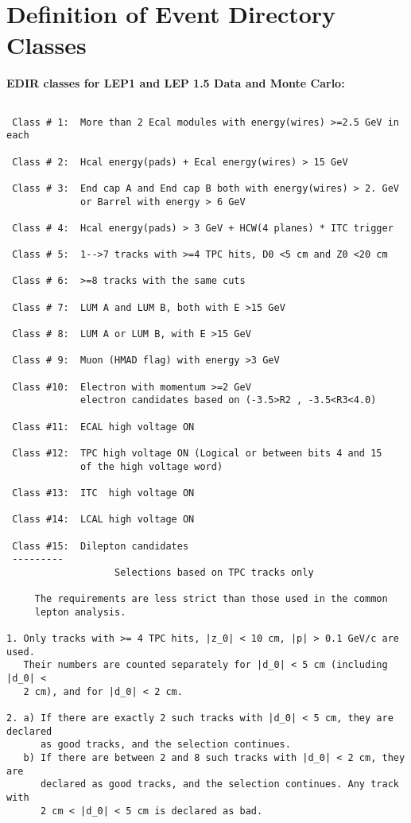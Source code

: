 \chapter{\label{sec-SED}Definition of Event Directory Classes}
\par
 
\bf{EDIR classes for LEP1 and LEP 1.5 Data and Monte Carlo:}
\par
\begin{verbatim}
 
 Class # 1:  More than 2 Ecal modules with energy(wires) >=2.5 GeV in each
 
 Class # 2:  Hcal energy(pads) + Ecal energy(wires) > 15 GeV
 
 Class # 3:  End cap A and End cap B both with energy(wires) > 2. GeV
             or Barrel with energy > 6 GeV
 
 Class # 4:  Hcal energy(pads) > 3 GeV + HCW(4 planes) * ITC trigger
 
 Class # 5:  1-->7 tracks with >=4 TPC hits, D0 <5 cm and Z0 <20 cm
 
 Class # 6:  >=8 tracks with the same cuts
 
 Class # 7:  LUM A and LUM B, both with E >15 GeV
 
 Class # 8:  LUM A or LUM B, with E >15 GeV
 
 Class # 9:  Muon (HMAD flag) with energy >3 GeV
 
 Class #10:  Electron with momentum >=2 GeV
             electron candidates based on (-3.5>R2 , -3.5<R3<4.0)
 
 Class #11:  ECAL high voltage ON
 
 Class #12:  TPC high voltage ON (Logical or between bits 4 and 15
             of the high voltage word)
 
 Class #13:  ITC  high voltage ON
 
 Class #14:  LCAL high voltage ON
 
 Class #15:  Dilepton candidates
 ---------
                   Selections based on TPC tracks only
 
     The requirements are less strict than those used in the common
     lepton analysis.
 
1. Only tracks with >= 4 TPC hits, |z_0| < 10 cm, |p| > 0.1 GeV/c are used.
   Their numbers are counted separately for |d_0| < 5 cm (including |d_0| <
   2 cm), and for |d_0| < 2 cm.
 
2. a) If there are exactly 2 such tracks with |d_0| < 5 cm, they are declared
      as good tracks, and the selection continues.
   b) If there are between 2 and 8 such tracks with |d_0| < 2 cm, they are
      declared as good tracks, and the selection continues. Any track with
      2 cm < |d_0| < 5 cm is declared as bad.
 

\end{verbatim}
